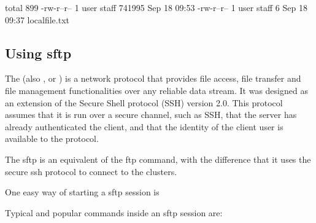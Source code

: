 \begin{prompt}
total  899
-rw-r--r--   1 user  staff  741995 Sep 18 09:53 %
-rw-r--r--   1 user  staff       6 Sep 18 09:37 localfile.txt
\end{prompt}

  \subsection{Using sftp}

  The  (also , or ) is a network protocol that provides file access,
  file transfer and file management functionalities over any reliable data
  stream. It was designed as an extension of the Secure Shell protocol (SSH)
  version 2.0. This protocol assumes that it is run over a secure channel, such
  as SSH, that the server has already authenticated the client, and that the
  identity of the client user is available to the protocol.

  The sftp is an equivalent of the ftp command, with the difference that it uses
  the secure ssh protocol to connect to the clusters.

  One easy way of starting a sftp session is

\begin{prompt}
\end{prompt}

  Typical and popular commands inside an sftp session are:

